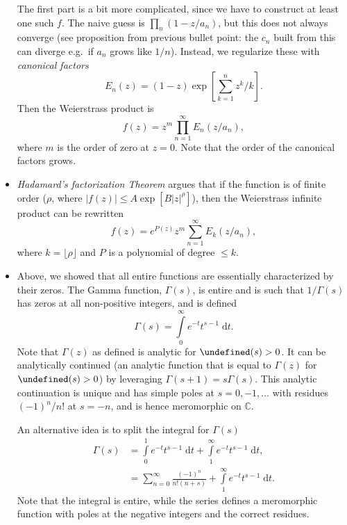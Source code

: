 \documentclass[11pt,
        usenames, %
        dvipsnames %
    ]{report}
\newcommand*{\abs}[1]{\left|#1\right|}
\newcommand*{\p}[1]{\left(#1\right)}
\newcommand*{\s}[1]{\left[#1\right]}
\let\Re\undefined
\DeclareMathOperator{\Re}{Re}
\begin{document}
\begin{itemize}
        The first part is a bit more complicated, since we have to construct at
        least one such $f$. The naive guess is $\prod_n \p{1 - z/a_n}$, but this
        does not always converge (see proposition from previous bullet point:
        the $c_n$ built from this can diverge e.g.\ if $a_n$ grows like $1/n$).
        Instead, we regularize these with \emph{canonical factors}
        \begin{equation}
            E_n(z) = \p{1 - z}\exp\s{\sum\limits_{k = 1}^nz^k/k}.
        \end{equation}
        Then the Weierstrass product is
        \begin{equation}
            f(z) = z^m \prod_{n = 1}^\infty E_n\p{z / a_n},
        \end{equation}
        where $m$ is the order of zero at $z = 0$. Note that the order of the
        canonical factors grows.

    \item \emph{Hadamard's factorization Theorem} argues that if the function is
        of finite order ($\rho$, where $\abs{f(z)} \leq
        A\exp\s{B\abs{z}^\rho}$), then the Weierstrass infinite product can be
        rewritten
        \begin{equation}
            f(z) = e^{P(z)}z^m\sum\limits_{n = 1}^\infty E_k\p{z / a_n},
        \end{equation}
        where $k = \lfloor \rho \rfloor$ and $P$ is a polynomial of degree $\leq
        k$.

    \item Above, we showed that all entire functions are essentially
        characterized by their zeros. The Gamma function, $\Gamma(s)$, is entire
        and is such that $1 / \Gamma(s)$ has zeros at all non-positive integers,
        and is defined
        \begin{equation}
            \Gamma(s) = \int\limits_0^\infty e^{-t}t^{s - 1}\;\mathrm{d}t.
        \end{equation}
        Note that $\Gamma(z)$ as defined is analytic for $\Re(s) > 0$. It can be
        analytically continued (an analytic function that is equal to
        $\Gamma(z)$ for $\Re(s) > 0$) by leveraging $\Gamma\p{s + 1} =
        s\Gamma(s)$. This analytic continuation is unique and has simple poles
        at $s = 0, -1,\dots$ with residues $\p{-1}^n/n!$ at $s = -n$, and is
        hence meromorphic on $\mathbb{C}$.

        An alternative idea is to split the integral for $\Gamma(s)$
        \begin{align}
            \Gamma(s) &= \int\limits_0^1 e^{-t}t^{s - 1}\;\mathrm{d}t
                + \int\limits_1^\infty e^{-t}t^{s - 1}\;\mathrm{d}t,\\
                &= \sum\limits_{n = 0}^\infty \frac{\p{-1}^n}{n!(n + s)}
                    + \int\limits_1^\infty e^{-t}t^{s - 1}\;\mathrm{d}t.
        \end{align}
        Note that the integral is entire, while the series defines a meromorphic
        function with poles at the negative integers and the correct residues.


\end{itemize}
\end{document}
